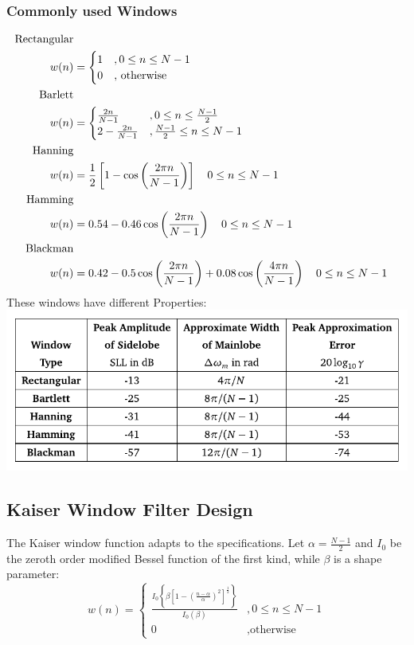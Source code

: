 \documentclass[accentcolor=tud4c,9.5pt,nochapname,bigchapter,paper=a5report]{tudreport}
\begin{document}
\subsubsection{Commonly used Windows}
\begin{subequations}
\begin{align}
\text{Rectangular} \notag \\
w(n) &= \begin{cases}
1 &,0\leq n \leq N-1\\
0		&\text{, otherwise}
\end{cases}\\
\text{Barlett} \notag \\
w(n) &= \begin{cases}
\frac{2n}{N-1} &,0\leq n \leq \frac{N-1}{2}\\
2-\frac{2n}{N-1}		&,\frac{N-1}{2}\leq n\leq N-1
\end{cases}\\
\text{Hanning} \notag \\
w(n)& = \frac{1}{2}\left[1-\cos\left(\frac{2\pi n}{N-1}\right)\right] \quad 0\leq n \leq N-1\\
\text{Hamming} \notag \\
w(n)& = 0.54-0.46\cos\left(\frac{2\pi n}{N-1}\right) \quad 0\leq n \leq N-1 \\
\text{Blackman} \notag \\
w(n)& = 0.42-0.5\cos\left(\frac{2\pi n}{N-1}\right)+0.08\cos\left(\frac{4\pi n}{N-1}\right) \quad 0\leq n \leq N-1
\end{align}
\end{subequations}
These windows have different Properties: \\
\includegraphics[width=\textwidth]{figures/window_props.pdf}


\subsection{Kaiser Window Filter Design}
The Kaiser window function adapts to the specifications. Let $\alpha = \frac{N-1}{2}$ and $I_0$ be the zeroth
order modified Bessel function of the first kind, while $\beta$ is a shape parameter:
\begin{equation}
w(n)=\begin{cases}
\frac{I_0\left\{\beta\left[1-\left(\frac{n-\alpha}{\alpha}\right)^2\right]^{\frac{1}{2}}\right\}}{I_0(\beta)} &,0\leq n\leq N-1\\
0 &,\text{otherwise}
\end{cases}
\end{equation}
\end{document}
